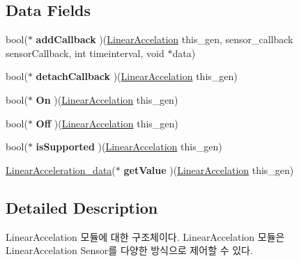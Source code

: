 \subsection*{Data Fields}
\begin{DoxyCompactItemize}
\item 
\hypertarget{struct__LinearAccelation_ae693a7f0650526be7b2439f650e811d5}{bool($\ast$ {\bfseries add\-Callback} )(\hyperlink{struct__LinearAccelation}{Linear\-Accelation} this\-\_\-gen, sensor\-\_\-callback sensor\-Callback, int timeinterval, void $\ast$data)}\label{struct__LinearAccelation_ae693a7f0650526be7b2439f650e811d5}

\item 
\hypertarget{struct__LinearAccelation_a8018bab15839a523647ae0eef1866403}{bool($\ast$ {\bfseries detach\-Callback} )(\hyperlink{struct__LinearAccelation}{Linear\-Accelation} this\-\_\-gen)}\label{struct__LinearAccelation_a8018bab15839a523647ae0eef1866403}

\item 
\hypertarget{struct__LinearAccelation_a4f1be3c71a431ac369f48cc7bdf4ab2e}{bool($\ast$ {\bfseries On} )(\hyperlink{struct__LinearAccelation}{Linear\-Accelation} this\-\_\-gen)}\label{struct__LinearAccelation_a4f1be3c71a431ac369f48cc7bdf4ab2e}

\item 
\hypertarget{struct__LinearAccelation_a117a2ff551470e568c61325a20047582}{bool($\ast$ {\bfseries Off} )(\hyperlink{struct__LinearAccelation}{Linear\-Accelation} this\-\_\-gen)}\label{struct__LinearAccelation_a117a2ff551470e568c61325a20047582}

\item 
\hypertarget{struct__LinearAccelation_afc42a6003589d08871b06adfc3f2ee9c}{bool($\ast$ {\bfseries is\-Supported} )(\hyperlink{struct__LinearAccelation}{Linear\-Accelation} this\-\_\-gen)}\label{struct__LinearAccelation_afc42a6003589d08871b06adfc3f2ee9c}

\item 
\hypertarget{struct__LinearAccelation_aaf02870c60aa510568b3376a4cd4d965}{\hyperlink{Sensor_8h_df/d29/struct__3d__data}{Linear\-Acceleration\-\_\-data}($\ast$ {\bfseries get\-Value} )(\hyperlink{struct__LinearAccelation}{Linear\-Accelation} this\-\_\-gen)}\label{struct__LinearAccelation_aaf02870c60aa510568b3376a4cd4d965}

\end{DoxyCompactItemize}


\subsection{Detailed Description}
Linear\-Accelation 모듈에 대한 구조체이다. Linear\-Accelation 모듈은 Linear\-Accelation Sensor를 다양한 방식으로 제어할 수 있다. 

